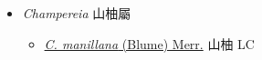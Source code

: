 
  \begin{itemize}
 \item[] \textit{Champereia} 山柚屬
                    
  \begin{itemize}
        \item[] \href{http://www.theplantlist.org/tpl1.1/search?q=Champereia+manillana}{\textit{C. manillana} (Blume) Merr.}   山柚 LC
  \end{itemize}
  \end{itemize}
